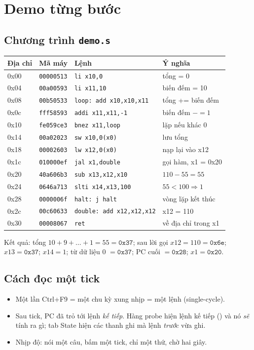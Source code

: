 \documentclass[11pt,a4paper]{article}
\newcommand{\sig}[1]{\texttt{\detokenize{#1}}}
\begin{document}
\section{Demo từng bước}
\label{sec:demo}
\subsection{Chương trình \texttt{demo.s}}
\begin{center}
\small
\begin{tabular}{@{}llll@{}}
\toprule
\textbf{Địa chỉ} & \textbf{Mã máy} & \textbf{Lệnh} & \textbf{Ý nghĩa}\\
\midrule
0x00 & \texttt{00000513} & \texttt{li x10,0} & tổng = 0\\
0x04 & \texttt{00a00593} & \texttt{li x11,10} & biến đếm = 10\\
0x08 & \texttt{00b50533} & \texttt{loop: add x10,x10,x11} & tổng += biến đếm\\
0x0c & \texttt{fff58593} & \texttt{addi x11,x11,-1} & biến đếm $-=1$\\
0x10 & \texttt{fe059ce3} & \texttt{bnez x11,loop} & lặp nếu khác 0\\
0x14 & \texttt{00a02023} & \texttt{sw x10,0(x0)} & lưu tổng\\
0x18 & \texttt{00002603} & \texttt{lw x12,0(x0)} & nạp lại vào x12\\
0x1c & \texttt{010000ef} & \texttt{jal x1,double} & gọi hàm, x1 = 0x20\\
0x20 & \texttt{40a606b3} & \texttt{sub x13,x12,x10} & $110-55=55$\\
0x24 & \texttt{0646a713} & \texttt{slti x14,x13,100} & $55<100\Rightarrow1$\\
0x28 & \texttt{0000006f} & \texttt{halt: j halt} & vòng lặp kết thúc\\
0x2c & \texttt{00c60633} & \texttt{double: add x12,x12,x12} & x12 = 110\\
0x30 & \texttt{00008067} & \texttt{ret} & về địa chỉ trong x1\\
\bottomrule
\end{tabular}
\end{center}
Kết quả: tổng $10+9+\dots+1=55=\mathtt{0x37}$; sau lời gọi $x12=110=\mathtt{0x6e}$; $x13=\mathtt{0x37}$; $x14=1$; từ dữ liệu 0 $=\mathtt{0x37}$; PC cuối $=\mathtt{0x28}$; $x1=\mathtt{0x20}$.

\subsection{Cách đọc một tick}
\begin{itemize}
  \item Một lần Ctrl+F9 = một chu kỳ xung nhịp = một lệnh (single-cycle).
  \item Sau tick, PC đã trỏ tới lệnh \emph{kế tiếp}. Hàng probe hiện lệnh kế tiếp (\sig{instr}) và nó \emph{sẽ} tính ra gì; tab State hiện các thanh ghi mà lệnh \emph{trước} vừa ghi.
  \item Nhịp độ: nói một câu, bấm một tick, chỉ một thứ, chờ hai giây.
\end{itemize}
\end{document}
